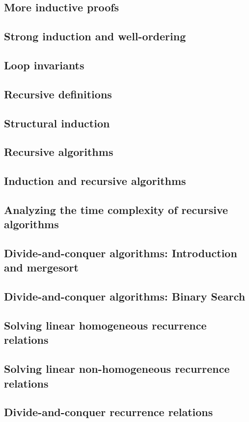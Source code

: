\subsection{More inductive proofs}


\subsection{Strong induction and well-ordering}


\subsection{Loop invariants}


\subsection{Recursive definitions}


\subsection{Structural induction}


\subsection{Recursive algorithms}


\subsection{Induction and recursive algorithms}


\subsection{Analyzing the time complexity of recursive algorithms}


\subsection{Divide-and-conquer algorithms: Introduction and mergesort}


\subsection{Divide-and-conquer algorithms: Binary Search}


\subsection{Solving linear homogeneous recurrence relations}


\subsection{Solving linear non-homogeneous recurrence relations}


\subsection{Divide-and-conquer recurrence relations}
